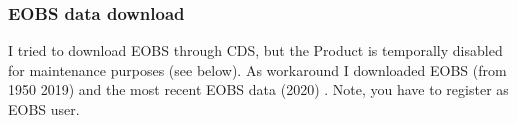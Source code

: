 \documentclass[letterpaper,10pt,english]{sphinxmanual}
\begin{document}
{
\begin{sphinxVerbatim}[commandchars=\\\{\}]
\llap{\color{nbsphinxin}[ ]:\,\hspace{\fboxrule}\hspace{\fboxsep}}  
                         \PYG{p}{[}\PYG{p}{]}
                         \PYG{p}{[}   \PYG{p}{]}
                         
\end{sphinxVerbatim}
}


\subsubsection{EOBS data download}
\label{\detokenize{Notebooks/1.Download/1.Retrieve:EOBS-data-download}}
I tried to download EOBS through CDS, but the Product is temporally disabled for maintenance purposes (see below). As workaround I downloaded EOBS (from 1950 \sphinxhyphen{} 2019) and the most recent EOBS data (2020) . Note, you have to register as E\sphinxhyphen{}OBS user.
\end{document}
